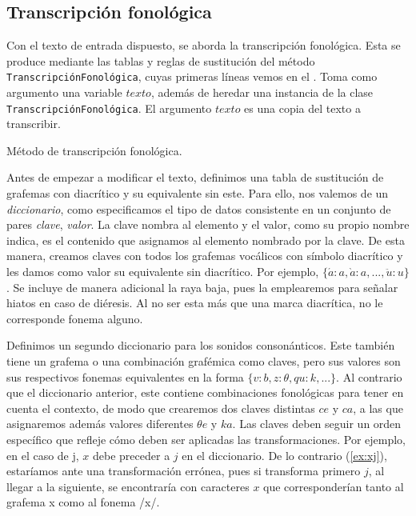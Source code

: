 \subsection{Transcripción fonológica}\label{met:fnl}
Con el texto de entrada dispuesto, se aborda la transcripción fonológica. Esta se produce mediante las tablas y reglas de sustitución del método \texttt{TranscripciónFonológica}, cuyas primeras líneas vemos en el . Toma como argumento una variable $texto$, además de heredar una instancia de la clase \texttt{TranscripciónFonológica}. El argumento $texto$ es una copia del texto a transcribir. 

\begin{algorithm}[!ht] %
	\caption{Método de transcripción fonológica.}\label{list:transcriptionfnl}
\end{algorithm}

Antes de empezar a modificar el texto, definimos una tabla de sustitución de grafemas con diacrítico y su equivalente sin este. Para ello, nos valemos de un \textit{diccionario}, como especificamos el tipo de datos consistente en un conjunto de pares \textit{clave}, \textit{valor}. La clave nombra al elemento y el valor, como su propio nombre indica, es el contenido que asignamos al elemento nombrado por la clave. De esta manera, creamos claves con todos los grafemas vocálicos con símbolo diacrítico y les damos como valor su equivalente sin diacrítico. Por ejemplo, $\{\acute{a}: a, \grave{a}: a, ..., \ddot{u}: u\}$. Se incluye de manera adicional la raya baja, pues la emplearemos para señalar hiatos en caso de diéresis. Al no ser esta más que una marca diacrítica, no le corresponde fonema alguno.

Definimos un segundo diccionario para los sonidos consonánticos. Este también tiene un grafema o una combinación grafémica como claves, pero sus valores son sus respectivos fonemas equivalentes en la forma $\{v: b, z: \theta, qu: k, ...\}$. Al contrario que el diccionario anterior, este contiene combinaciones fonológicas para tener en cuenta el contexto, de modo que crearemos dos claves distintas $ce$ y $ca$, a las que asignaremos además valores diferentes $\theta e$ y $ka$. Las claves deben seguir un orden específico que refleje cómo deben ser aplicadas las transformaciones. Por ejemplo, en el caso de \textlangle{}j\textrangle{},  $x$ debe preceder a $j$ en el diccionario. De lo contrario (\ref{ex:xj}), estaríamos ante una transformación errónea, pues si transforma primero $j$, al llegar a la siguiente, se encontraría con caracteres $x$ que corresponderían tanto al grafema \textlangle{}x\textrangle{} como al fonema /x/.

